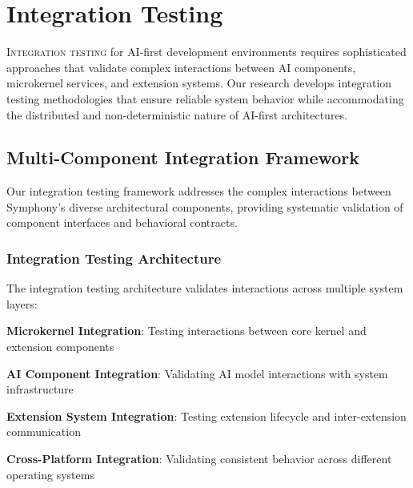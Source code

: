 
\section*{Integration Testing}

\vspace{0.5cm}
\lettrine{I}{ntegration testing} for AI-first development environments requires sophisticated approaches that validate complex interactions between AI components, microkernel services, and extension systems. Our research develops integration testing methodologies that ensure reliable system behavior while accommodating the distributed and non-deterministic nature of AI-first architectures.

\subsection*{Multi-Component Integration Framework}

Our integration testing framework addresses the complex interactions between Symphony's diverse architectural components, providing systematic validation of component interfaces and behavioral contracts.

\subsubsection*{Integration Testing Architecture}

The integration testing architecture validates interactions across multiple system layers:

\begin{expandedlist}
    \item \textbf{Microkernel Integration}: Testing interactions between core kernel and extension components
    \item \textbf{AI Component Integration}: Validating AI model interactions with system infrastructure
    \item \textbf{Extension System Integration}: Testing extension lifecycle and inter-extension communication
    \item \textbf{Cross-Platform Integration}: Validating consistent behavior across different operating systems
\end{expandedlist}

